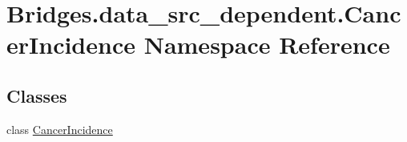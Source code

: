 \hypertarget{namespace_bridges_1_1data__src__dependent_1_1_cancer_incidence}{}\section{Bridges.\+data\+\_\+src\+\_\+dependent.\+Cancer\+Incidence Namespace Reference}
\label{namespace_bridges_1_1data__src__dependent_1_1_cancer_incidence}
\subsection*{Classes}
\begin{DoxyCompactItemize}
\item 
class \hyperlink{class_bridges_1_1data__src__dependent_1_1_cancer_incidence_1_1_cancer_incidence}{Cancer\+Incidence}
\end{DoxyCompactItemize}
